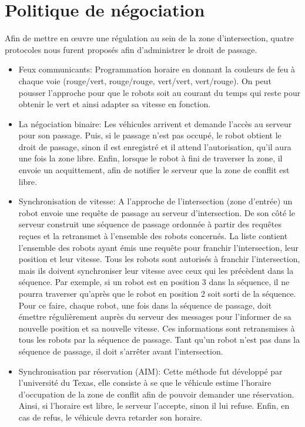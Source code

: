 \documentclass[french,a4paper,12pt]{report}
\begin{document}
\chapter{Politique de négociation}
Afin de mettre en œuvre une régulation au sein de la zone d'intersection, quatre protocoles nous furent proposés
afin d'administrer le droit de passage.

\begin{itemize}
\item Feux communicants:
Programmation horaire en donnant la couleurs de feu à chaque voie (rouge/vert, rouge/rouge, vert/vert, vert/rouge).
On peut pousser l'approche pour que le robots soit au courant du temps qui reste pour obtenir le vert et ainsi adapter sa vitesse en fonction.

\item La négociation binaire:
Les véhicules arrivent et demande l'accès au serveur pour son passage.
Puis, si le passage n'est pas occupé, le robot obtient le droit de passage, sinon il est enregistré et il attend l'autorisation, qu'il aura une fois la zone libre.
Enfin, lorsque le robot à fini de traverser la zone, il envoie un acquittement, afin de notifier le serveur que la zone de conflit est libre.

\item Synchronisation de vitesse:
A l’approche de l'intersection (zone d’entrée) un robot envoie une requête de passage au serveur d’intersection.
De son côté le serveur construit une séquence de passage ordonnée à partir des requêtes reçues et la retransmet
à l’ensemble des robots concernés. La liste contient l’ensemble des robots ayant émis une requête pour franchir
l’intersection, leur position et leur vitesse. Tous les robots sont autorisés à franchir l’intersection, mais ils doivent synchroniser leur vitesse avec ceux qui les précèdent dans la séquence. Par exemple, si un robot est en position 3 dans la séquence, il ne pourra traverser qu’après que le robot en position 2 soit sorti de la séquence. Pour ce faire, chaque robot, une fois dans la séquence de passage, doit émettre régulièrement auprès du serveur des messages pour l’informer de sa nouvelle position et sa nouvelle vitesse. Ces informations sont retransmises à
tous les robots par la séquence de passage. Tant qu’un robot n’est pas dans la séquence de passage, il doit s’arrêter avant l’intersection.

\item Synchronisation par réservation (AIM):
Cette méthode fut développé par l'université du Texas, elle consiste à se que le véhicule estime l'horaire d'occupation de la zone de conflit afin de pouvoir demander une réservation.
Ainsi, si l'horaire est libre, le serveur l'accepte, sinon il lui refuse.
Enfin, en cas de refus, le véhicule devra retarder son horaire.
\end{itemize}
\end{document}
